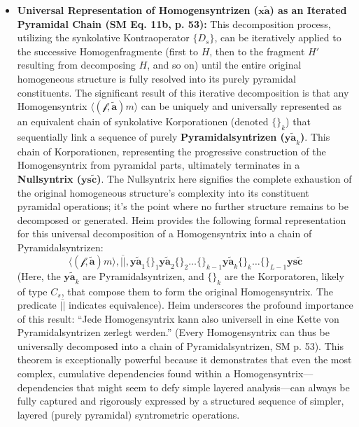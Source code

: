\documentclass[12pt]{article}
\newcommand{\q}[1]{\enquote{#1}}
\newcommand{\syntrix}{\bm{y\widetilde{a}}}
\newcommand{\homogeneoussyntrix}{\bm{x\widetilde{a}}}
\newcommand{\metrophor}{\bm{\widetilde{a}}}
\newcommand{\synkolator}{\mathcal{f}}
\newcommand{\synkolationsstufe}{m}
\newcommand{\nullsyntrix}{\bm{ys\widetilde{c}}}
\begin{document}
\begin{itemize}
    \item \textbf{Universal Representation of Homogensyntrizen (\(\homogeneoussyntrix\)) as an Iterated Pyramidal Chain (SM Eq. 11b, p. 53):}
    This decomposition process, utilizing the synkolative Kontraoperator \( \{D_s\} \), can be iteratively applied to the successive Homogenfragmente (first to \( H \), then to the fragment \( H' \) resulting from decomposing \( H \), and so on) until the entire original homogeneous structure is fully resolved into its purely pyramidal constituents. The significant result of this iterative decomposition is that any Homogensyntrix \( \langle(\synkolator,\metrophor)\synkolationsstufe\rangle \) can be uniquely and universally represented as an equivalent chain of synkolative Korporationen (denoted \( \{ \}_k \)) that sequentially link a sequence of purely \textbf{Pyramidalsyntrizen (\( \syntrix_k \))}. This chain of Korporationen, representing the progressive construction of the Homogensyntrix from pyramidal parts, ultimately terminates in a \textbf{Nullsyntrix (\( \nullsyntrix \))}. The Nullsyntrix here signifies the complete exhaustion of the original homogeneous structure's complexity into its constituent pyramidal operations; it's the point where no further structure remains to be decomposed or generated.
    Heim provides the following formal representation for this universal decomposition of a Homogensyntrix into a chain of Pyramidalsyntrizen:
    \begin{equation}
    \langle (\synkolator, \metrophor) \synkolationsstufe \rangle, \overline{||}, \syntrix_1 \{ \}_1 \syntrix_2 \{ \}_2 \dots \{ \}_{k-1} \syntrix_k \{ \}_k \dots \{ \}_{L-1} \nullsyntrix
    \label{eq:homogen_to_pyramidal_chain_original}
    \end{equation}
    (Here, the \( \syntrix_k \) are Pyramidalsyntrizen, and \( \{ \}_k \) are the Korporatoren, likely of type \( C_s \), that compose them to form the original Homogensyntrix. The predicate \( \overline{||} \) indicates equivalence). Heim underscores the profound importance of this result: \q{Jede Homogensyntrix kann also universell in eine Kette von Pyramidalsyntrizen zerlegt werden.} (Every Homogensyntrix can thus be universally decomposed into a chain of Pyramidalsyntrizen, SM p. 53). This theorem is exceptionally powerful because it demonstrates that even the most complex, cumulative dependencies found within a Homogensyntrix—dependencies that might seem to defy simple layered analysis—can always be fully captured and rigorously expressed by a structured sequence of simpler, layered (purely pyramidal) syntrometric operations.


\end{itemize}
\end{document}
